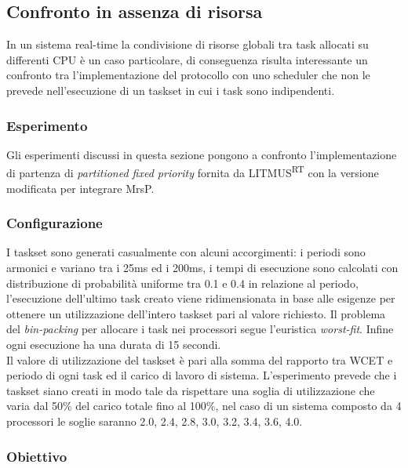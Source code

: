 {\subsection{Confronto in assenza di risorsa}
\label{sec:confronto_norisorsa}

\noindent In un sistema real-time la condivisione di risorse globali tra task allocati su differenti CPU è un caso particolare, di conseguenza risulta interessante un confronto tra l'implementazione del protocollo con uno scheduler che non le prevede nell'esecuzione di un taskset in cui i task sono indipendenti.

\subsubsection{Esperimento}
\label{sec:confronto_norisorsa_exp}

\noindent Gli esperimenti discussi in questa sezione pongono a confronto l'implementazione di partenza di \textit{partitioned fixed priority} fornita da LITMUS\textsuperscript{RT} con la versione modificata per integrare MrsP.

\subsubsection{Configurazione}
\label{sec:confronto_norisorsa_conf}

\noindent I taskset sono generati casualmente con alcuni accorgimenti: i periodi sono armonici e variano tra i 25ms ed i 200ms, i tempi di esecuzione sono calcolati con distribuzione di probabilità uniforme tra 0.1 e 0.4 in relazione al periodo, l'esecuzione dell'ultimo task creato viene ridimensionata in base alle esigenze per ottenere un utilizzazione dell'intero taskset pari al valore richiesto. Il problema del \textit{bin-packing} per allocare i task nei processori segue l'euristica \textit{worst-fit}. Infine ogni esecuzione ha una durata di 15 secondi.\\

\noindent Il valore di utilizzazione del taskset è pari alla somma del rapporto tra WCET e periodo di ogni task ed il carico di lavoro di sistema. L'esperimento prevede che i taskset siano creati in modo tale da rispettare una soglia di utilizzazione che varia dal 50\% del carico totale fino al 100\%, nel caso di un sistema composto da 4 processori le soglie saranno 2.0, 2.4, 2.8, 3.0, 3.2, 3.4, 3.6, 4.0.

\subsubsection{Obiettivo}
\label{sec:confronto_norisorsa_ob}

}
